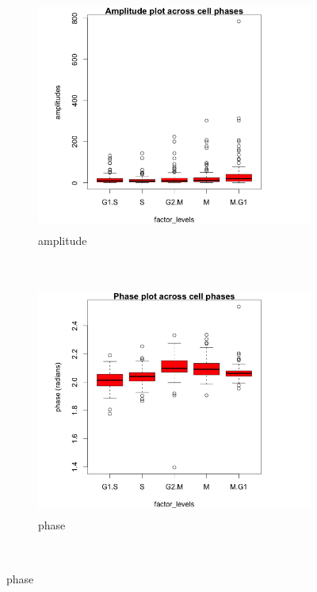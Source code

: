 \documentclass[11pt]{article}
\begin{document}
 \begin{figure}[ht]
    \centering    
     \begin{subfigure}[t]{0.5\textwidth}
        \centering
        \includegraphics[height=3in]{../figures/cell_order_R_figs/amp_plot_genes_ipsc.png}
        \caption{amplitude}
    \end{subfigure}%
    ~
    \begin{subfigure}[t]{0.5\textwidth}
        \centering
        \includegraphics[height=3in]{../figures/cell_order_R_figs/phase_plot_genes_ipsc.png}
        \caption{phase}
    \end{subfigure}\\
    

\end{figure}
\end{document}

